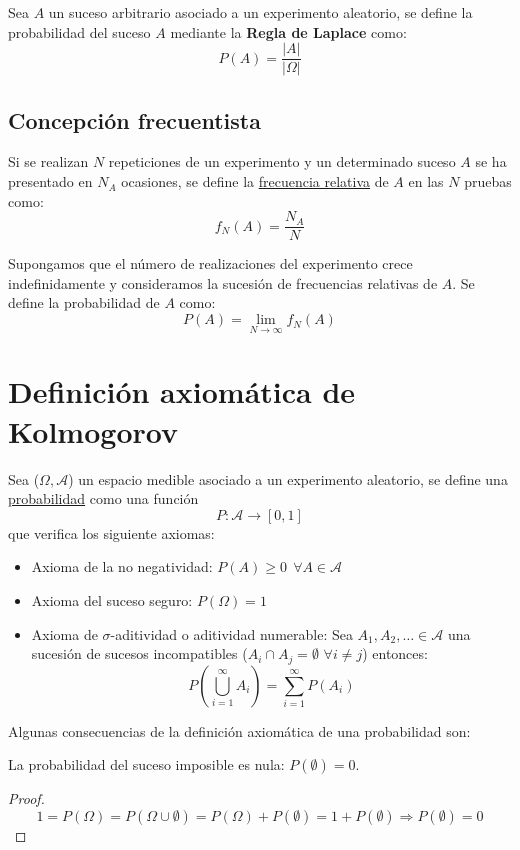 Sea $A$ un suceso arbitrario asociado a un experimento aleatorio, se define la probabilidad del suceso $A$ mediante la \textbf{Regla de Laplace} como: $$P(A) = \dfrac{|A|}{|\Omega|}$$

\subsection{Concepción frecuentista}

Si se realizan $N$ repeticiones de un experimento y un determinado suceso $A$ se ha presentado en $N_A$
ocasiones, se define la \underline{frecuencia relativa} de $A$ en las $N$ pruebas como:
$$f_N(A) = \dfrac{N_A}{N}$$


Supongamos que el número de realizaciones del experimento crece indefinidamente y consideramos la sucesión
de frecuencias relativas de $A$. Se define la probabilidad de $A$ como:
$$P(A) = \lim_{N \to \infty} f_N(A)$$

\section{Definición axiomática de Kolmogorov}

Sea ($\Omega, \mathcal{A}$) un espacio medible asociado a un experimento aleatorio, se define una
\underline{probabilidad} como una función
$$P: \mathcal{A} \rightarrow [0,1]$$
que verifica los siguiente axiomas:
\begin{itemize}
  \item Axioma de la no negatividad: $P(A) \geq 0~~\forall A \in \mathcal{A}$
  \item Axioma del suceso seguro: $P(\Omega) = 1$
  \item Axioma de $\sigma$-aditividad o aditividad numerable:
        Sea $A_1, A_2, \ldots \in \mathcal{A}$ una sucesión de sucesos incompatibles ($A_i \cap A_j = \emptyset$
        $\forall i \neq j$) entonces:
        $$P\left(\bigcup_{i=1}^\infty A_i \right) = \sum_{i=1}^\infty P(A_i)$$
\end{itemize}

Algunas consecuencias de la definición axiomática de una probabilidad son:
\begin{prop}
    La probabilidad del suceso imposible es nula: $P(\emptyset)=0$.
\end{prop}
\begin{proof}
  $$1 = P(\Omega) = P(\Omega \cup \emptyset) = P(\Omega) + P(\emptyset) = 1 + P(\emptyset) \Rightarrow
    P(\emptyset) = 0$$
\end{proof}


